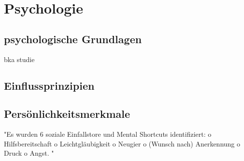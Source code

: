 \chapter{Psychologie}
\label{chapter:psychologie}

\section{psychologische Grundlagen}

bka studie


\section{Einflussprinzipien}



\section{Persönlichkeitsmerkmale}



"Es wurden 6 soziale Einfallstore und Mental Shortcuts identifiziert:
o Hilfsbereitschaft
o Leichtgläubigkeit
o Neugier
o (Wunsch nach) Anerkennung
o Druck
o Angst.
"\cite{10_bka}

